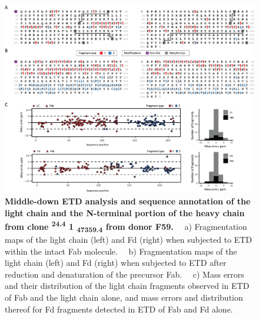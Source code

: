 \begin{subappendices}
  \begin{figure}[!ht]
    \center
    \includegraphics[]{Chapter.3/Figures/fs6.png}
    \caption{
      \textbf{Middle-down ETD analysis and sequence annotation of the light chain and the N-terminal portion of the
        heavy chain from clone \textsuperscript{24.4} 1 \textsubscript{47359.4} from donor F59.} ~~a) Fragmentation maps of the light chain (left) and Fd (right) when subjected to ETD within the intact Fab molecule. ~~b) Fragmentation maps of the light chain (left) and Fd (right) when subjected to ETD after reduction and denaturation of the precursor Fab. ~~c) Mass errors and their distribution of the light chain fragments observed in ETD of Fab and the light chain alone, and mass errors and distribution thereof for Fd fragments detected in ETD of Fab and Fd alone.
    }
    \label{fig:figs3.6}
  \end{figure}

  \vspace{1cm}


\end{subappendices}
